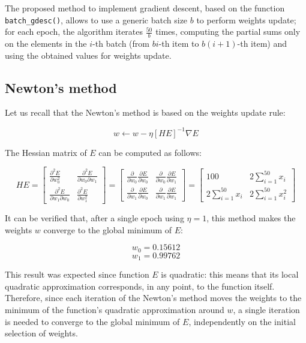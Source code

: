 \documentclass[letterpaper,headings=standardclasses]{scrartcl}
\begin{document}
The proposed method to implement gradient descent, based on the function \texttt{batch\_gdesc()}, allows to use a generic batch size $b$ to perform weights update; for each epoch, the algorithm iterates $\frac{50}{b}$ times, computing the partial sums only on the elements in the $i$-th batch (from $bi$-th item to $b(i+1)$-th item) and using the obtained values for weights update.

\subsection{Newton's method}

Let us recall that the Newton's method is based on the weights update rule:

$$ w \leftarrow w - \eta [HE]^{-1} \nabla E $$

The Hessian matrix of $E$ can be computed as follows:

$$ HE = \left[ \begin{matrix} \frac{\partial^2 E}{\partial w_0^2} & \frac{\partial^2 E}{\partial w_0 \partial w_1} \\[0.5em] \frac{\partial^2 E}{\partial w_1 \partial w_0} & \frac{\partial^2 E}{\partial w_1^2} \end{matrix} \right] = \left[ \begin{matrix} \frac{\partial}{\partial w_0} \frac{\partial E}{\partial w_0} & \frac{\partial}{\partial w_0} \frac{\partial E}{\partial w_1} \\[0.5em] \frac{\partial}{\partial w_1} \frac{\partial E}{\partial w_0} & \frac{\partial}{\partial w_1} \frac{\partial E}{\partial w_1} \end{matrix} \right] = \left[ \begin{matrix} 100 & 2 \sum_{i = 1}^{50} x_i \\[0.5em] 2 \sum_{i = 1}^{50} x_i & 2 \sum_{i = 1}^{50} x_i^2 \end{matrix} \right] $$

It can be verified that, after a single epoch using $\eta = 1$, this method makes the weights $w$ converge to the global minimum of $E$:

$$ w_0 = 0.15612 $$
$$ w_1 = 0.99762 $$

This result was expected since function $E$ is quadratic: this means that its local quadratic approximation corresponds, in any point, to the function itself. Therefore, since each iteration of the Newton's method moves the weights to the minimum of the function's quadratic approximation around $w$, a single iteration is needed to converge to the global minimum of $E$, independently on the initial selection of weights.
\end{document}

